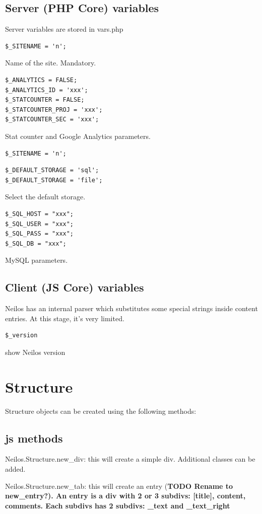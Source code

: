 \documentclass[a4paper,12pt]{article}
\begin{document}
\subsection{Server (PHP Core) variables}
Server variables are stored in vars.php

\begin{list}{-}{}
\item \begin{verbatim}
$_SITENAME = 'n';
\end{verbatim}
Name of the site. Mandatory.
\item \begin{verbatim}
$_ANALYTICS = FALSE;
$_ANALYTICS_ID = 'xxx';
$_STATCOUNTER = FALSE;
$_STATCOUNTER_PROJ = 'xxx';
$_STATCOUNTER_SEC = 'xxx';
\end{verbatim}
Stat counter and Google Analytics parameters.
\item \begin{verbatim}
$_SITENAME = 'n';
\end{verbatim}
\item \begin{verbatim}
$_DEFAULT_STORAGE = 'sql';
$_DEFAULT_STORAGE = 'file';
\end{verbatim}
Select the default storage.
\item \begin{verbatim}
$_SQL_HOST = "xxx";
$_SQL_USER = "xxx";
$_SQL_PASS = "xxx";
$_SQL_DB = "xxx";
\end{verbatim}
MySQL parameters.
\end{list}


\subsection{Client (JS Core) variables}
Neilos has an internal parser which substitutes some special strings inside content entries. At this stage, it's very limited.
\begin{list}{-}{}
\item \begin{verbatim}
$_version
\end{verbatim}
show Neilos version
\end{list}
\normalsize
\section{Structure}
Structure objects can be created using the following methods:
\subsection{js methods}
\begin{list}{-}{}
 \item Neilos.Structure.new\_div: this will create a simple div. Additional classes can be added.
\item Neilos.Structure.new\_tab: this will create an entry (\bfseries{TODO} \normalfont Rename to new\_entry?). An entry is a div with 2 or 3 subdivs: [title], content, comments. Each subdivs has 2 subdivs: \_text and \_text\_right
\end{list}
\end{document}
